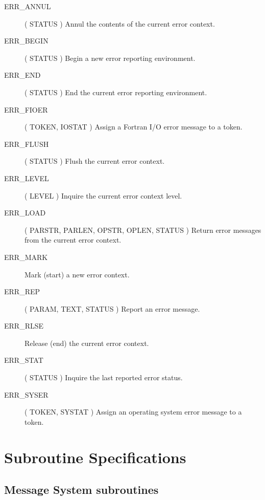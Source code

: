 \begin {description}
\item [ERR\_ANNUL] ( STATUS ) 
\subitem Annul the contents of the current error context.
\indexspace
\item [ERR\_BEGIN] ( STATUS )
\subitem Begin a new error reporting environment.
\indexspace
\item [ERR\_END] ( STATUS )
\subitem End the current error reporting environment.
\indexspace
\item [ERR\_FIOER] ( TOKEN, IOSTAT ) 
\subitem Assign a Fortran I/O error message to a token.
\indexspace
\item [ERR\_FLUSH] ( STATUS ) 
\subitem Flush the current error context.
\indexspace
\item [ERR\_LEVEL] ( LEVEL )
\subitem Inquire the current error context level.
\indexspace
\item [ERR\_LOAD] ( PARSTR, PARLEN, OPSTR, OPLEN, STATUS ) 
\subitem Return error messages from the current error context.
\indexspace
\item [ERR\_MARK] \hfill
\subitem Mark (start) a new error context.
\indexspace
\item [ERR\_REP] ( PARAM, TEXT, STATUS ) 
\subitem Report an error message.
\indexspace
\item [ERR\_RLSE] \hfill
\subitem Release (end) the current error context.
\indexspace
\item [ERR\_STAT] ( STATUS )
\subitem Inquire the last reported error status.
\indexspace
\item [ERR\_SYSER] ( TOKEN, SYSTAT ) 
\subitem Assign an operating system error message to a token.
\end {description}

\newpage
\section {Subroutine Specifications}

\subsection {Message System subroutines}

